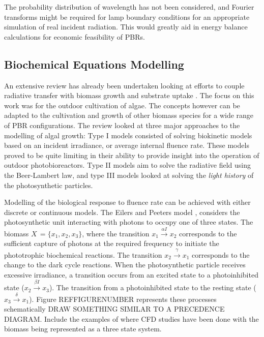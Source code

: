 The probability distribution of wavelength has not been considered, and Fourier transforms might be required for lamp boundary conditions for an appropriate simulation of real incident radiation. This would greatly aid in energy balance calculations for economic feasibility of PBRs. 

\subsection{Biochemical Equations Modelling}
\label{S:3.3}
An extensive review has already been undertaken looking at efforts to couple radiative transfer with biomass growth and substrate uptake \cite{Bechet2013}. The focus on this work was for the outdoor cultivation of algae. The concepts however can be adapted to the cultivation and growth of other biomass species for a wide range of PBR configurations. The review looked at three major approaches to the modelling of algal growth: Type I models consisted of solving biokinetic models based on an incident irradiance, or average internal fluence rate. These models proved to be quite limiting in their ability to provide insight into the operation of outdoor photobioreactors. Type II models aim to solve the radiative field using the Beer-Lambert law, and type III models looked at solving the \textit{light history} of the photosynthetic particles.


Modelling of the biological response to fluence rate can be achieved with either discrete or continuous models. The Eilers and Peeters model \cite{Eilers1988}, considers the photosynthetic unit interacting with photons to occupy one of three states. The biomass $X \,= \{x_1, x_2, x_3\}$, where the transition $x_1 \xrightarrow{\alpha I} x_2$ corresponds to the sufficient capture of photons at the required frequency to initiate the phototrophic biochemical reactions. The transition $x_2 \xrightarrow{\gamma} x_1$ corresponds to the change to the dark cycle reactions. When the photosynthetic particle receives excessive irradiance, a transition occurs from an excited state to a photoinhibited state ($x_2 \xrightarrow{\beta I} x_3$). The transition from a photoinhibited state to the resting state ($x_3 \xrightarrow{\delta} x_1$). Figure REFFIGURENUMBER represents these processes schematically DRAW SOMETHING SIMILAR TO A PRECEDENCE DIAGRAM. Include the examples of where CFD studies have been done with the biomass being represented as a three state system.

